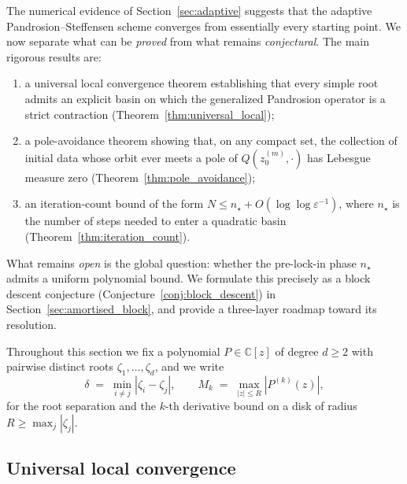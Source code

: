 \documentclass[10pt,a4paper,oneside]{book}
\theoremstyle{definition}
\theoremstyle{remark}
\newcommand{\CC}{\mathbb{C}}
\begin{document}
The numerical evidence of Section~\ref{sec:adaptive} suggests that the adaptive Pandrosion--Steffensen scheme converges from essentially every starting point.  We now separate what can be \emph{proved} from what remains \emph{conjectural}.  The main rigorous results are:
\begin{enumerate}
  \item[(i)] a universal local convergence theorem establishing that every simple root admits an explicit basin on which the generalized Pandrosion operator is a strict contraction (Theorem~\ref{thm:universal_local});
  \item[(ii)] a pole-avoidance theorem showing that, on any compact set, the collection of initial data whose orbit ever meets a pole of $Q(z_0^{(m)}, \cdot)$ has Lebesgue measure zero (Theorem~\ref{thm:pole_avoidance});
  \item[(iii)] an iteration-count bound of the form $N \leq n_\star + O(\log\log \varepsilon^{-1})$, where $n_\star$ is the number of steps needed to enter a quadratic basin (Theorem~\ref{thm:iteration_count}).
\end{enumerate}
What remains \emph{open} is the global question: whether the pre-lock-in phase $n_\star$ admits a uniform polynomial bound.  We formulate this precisely as a block descent conjecture (Conjecture~\ref{conj:block_descent}) in Section~\ref{sec:amortised_block}, and provide a three-layer roadmap toward its resolution.

Throughout this section we fix a polynomial $P \in \CC[z]$ of degree $d \geq 2$ with pairwise distinct roots $\zeta_1, \ldots, \zeta_d$, and we write
\[
  \delta \;=\; \min_{i \neq j} |\zeta_i - \zeta_j|,
  \qquad
  M_k \;=\; \max_{|z| \leq R} |P^{(k)}(z)|,
\]
for the root separation and the $k$-th derivative bound on a disk of radius $R \geq \max_j |\zeta_j|$.

\subsection{Universal local convergence}
\end{document}
